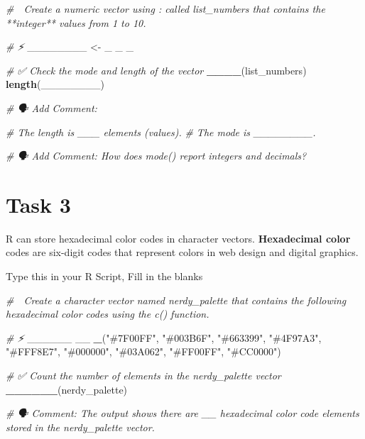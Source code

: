 \documentclass[
  12pt,
]{scrreprt}
\newenvironment{Shaded}{\begin{snugshade}}{\end{snugshade}}
\newcommand{\CommentTok}[1]{\textcolor[rgb]{0.56,0.35,0.01}{\textit{#1}}}
\newcommand{\FunctionTok}[1]{\textcolor[rgb]{0.13,0.29,0.53}{\textbf{#1}}}
\newcommand{\NormalTok}[1]{#1}
\newcommand{\OtherTok}[1]{\textcolor[rgb]{0.56,0.35,0.01}{#1}}
\newcommand{\StringTok}[1]{\textcolor[rgb]{0.31,0.60,0.02}{#1}}
\begin{document}
\begin{Shaded}
\begin{Highlighting}[]
\CommentTok{\# 🎯 Create a numeric vector using \textasciigrave{}:\textasciigrave{} called \textasciigrave{}list\_numbers\textasciigrave{} that contains the **integer** values from 1 to 10.}


\CommentTok{\# ⚡}
\NormalTok{\_\_\_\_\_\_\_\_ }\OtherTok{\textless{}{-}}\NormalTok{ \_ \_ \_}

\CommentTok{\# ✅ Check the mode and length of the vector}
\FunctionTok{\_\_\_\_}\NormalTok{(list\_numbers)}
\FunctionTok{length}\NormalTok{(\_\_\_\_\_\_\_\_)}

\CommentTok{\# 🗣 Add Comment:  }
 
\CommentTok{\# The length is \_\_\_ elements (values).}
\CommentTok{\# The mode is \_\_\_\_\_\_\_\_.}
                 
\CommentTok{\# 🗣 Add Comment: How does \textasciigrave{}mode()\textasciigrave{} report integers and decimals?}
\end{Highlighting}
\end{Shaded}

\section{Task 3}\label{task-3}

R can store hexadecimal color codes in character vectors.
\textbf{Hexadecimal color} codes are six-digit codes that represent
colors in web design and digital graphics.

Type this in your R Script, Fill in the blanks

\begin{Shaded}
\begin{Highlighting}[]
\CommentTok{\# 🎯 Create a character vector named \textasciigrave{}nerdy\_palette\textasciigrave{} that contains the following hexadecimal color codes using the \textasciigrave{}c()\textasciigrave{} function.}

\CommentTok{\# ⚡ }
\NormalTok{\_\_\_\_\_\_ \_\_ }\FunctionTok{\_}\NormalTok{(}\StringTok{"\#7F00FF"}\NormalTok{, }\StringTok{"\#003B6F"}\NormalTok{, }\StringTok{"\#663399"}\NormalTok{, }\StringTok{"\#4F97A3"}\NormalTok{, }\StringTok{"\#FFF8E7"}\NormalTok{, }\StringTok{"\#000000"}\NormalTok{, }\StringTok{"\#03A062"}\NormalTok{, }\StringTok{"\#FF00FF"}\NormalTok{, }\StringTok{"\#CC0000"}\NormalTok{)}

\CommentTok{\# ✅ Count the number of elements in the nerdy\_palette vector }
\FunctionTok{\_\_\_\_\_\_}\NormalTok{(nerdy\_palette)}


\CommentTok{\# 🗣 Comment: The output shows there are \_\_ hexadecimal color code elements stored in the \textasciigrave{}nerdy\_palette\textasciigrave{} vector.}
\end{Highlighting}
\end{Shaded}
\end{document}
